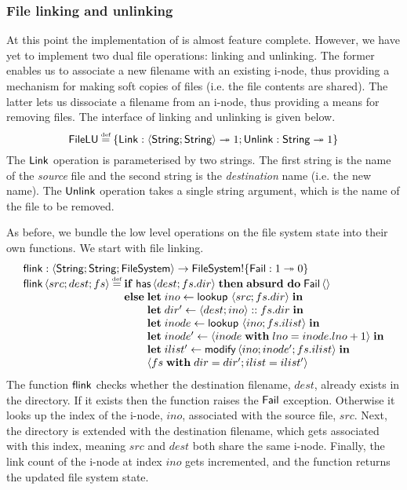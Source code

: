 \documentclass[12pt,phd,lfcs,twoside,openright,logo,leftchapter,normalheadings]{infthesis}
\theoremstyle{plain}
\theoremstyle{definition}
\begin{document}
\subsubsection{File linking and unlinking}
%
At this point the implementation of \fsname{} is almost feature
complete. However, we have yet to implement two dual file operations:
linking and unlinking. The former enables us to associate a new
filename with an existing i-node, thus providing a mechanism for
making soft copies of files (i.e. the file contents are
shared). The latter lets us dissociate a filename from an i-node, thus
providing a means for removing files. The interface of linking and
unlinking is given below.
%
\[
  \dec{FileLU} \defas \{\ULink : \Record{\String;\String} \opto \UnitType; \UUnlink : \String \opto \UnitType\}
\]
%
The $\mathsf{Link}$ operation is parameterised by two strings. The first
string is the name of the \emph{source} file and the second string is
the \emph{destination} name (i.e. the new name). The $\mathsf{Unlink}$
operation takes a single string argument, which is the name of the
file to be removed.

As before, we bundle the low level operations on the file system state
into their own functions. We start with file linking.
%
\[
  \bl
    \flink : \Record{\String;\String;\FileSystem} \to \FileSystem \eff \{\Fail : \UnitType \opto \ZeroType\}\\
    \flink\,\Record{src;dest;fs} \defas
      \bl
        \If\;\dec{has}\,\Record{dest;fs.dir}\;\Then\;\Absurd~\Do\;\Fail\,\Unit\\
        \Else\;
          \bl
            \Let\;ino \revto \lookup~\Record{src;fs.dir}\;\In\\
            \Let\;dir' \revto \Record{dest;ino} \cons fs.dir\;\In\\
            \Let\;inode \revto \lookup~\Record{ino;fs.ilist}\;\In\\
            \Let\;inode' \revto \Record{inode\;\With\;lno = inode.lno + 1}\;\In\\
            \Let\;ilist' \revto \modify\,\Record{ino;inode';fs.ilist}\;\In\\
            \Record{fs\;\With\;dir = dir';ilist = ilist'}
          \el
      \el
  \el
\]
%
The function $\mathsf{flink}$ checks whether the destination filename, $dest$,
already exists in the directory. If it exists then the function raises
the $\mathsf{Fail}$ exception. Otherwise it looks up the index of the i-node,
$ino$, associated with the source file, $src$. Next, the directory is
extended with the destination filename, which gets associated with
this index, meaning $src$ and $dest$ both share the same
i-node. Finally, the link count of the i-node at index $ino$ gets
incremented, and the function returns the updated file system state.
%
\end{document}
